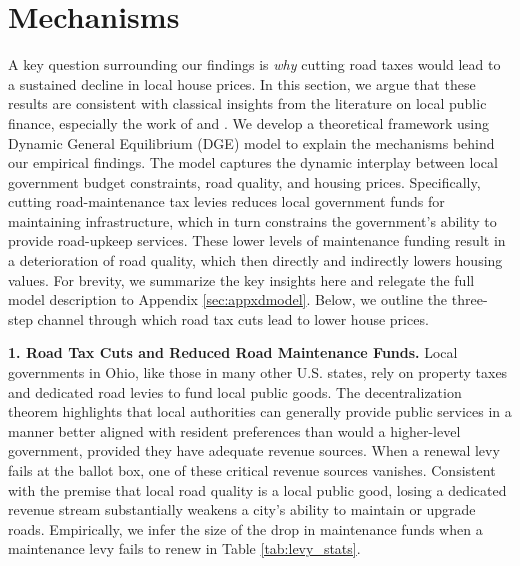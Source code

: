 \section{Mechanisms} \label{sec:mech}

A key question surrounding our findings is \textit{why} cutting road taxes would lead to a sustained decline in local house prices. In this section, we argue that these results are consistent with classical insights from the literature on local public finance, especially the work of \cite{Oates1972} and \cite{edel1974taxes}. We develop a theoretical framework using Dynamic General Equilibrium (DGE) model to explain the mechanisms behind our empirical findings.
The model captures the dynamic interplay between local government budget constraints, road quality, and housing prices. Specifically, cutting road-maintenance tax levies reduces local government funds for maintaining infrastructure, which in turn constrains the government’s ability to provide road-upkeep services. These lower levels of maintenance funding result in a deterioration of road quality, which then directly and indirectly lowers housing values. 
For brevity, we summarize the key insights here and relegate the full model description to Appendix \ref{sec:appxdmodel}. Below, we outline the three-step channel through which road tax cuts lead to lower house prices.


\noindent
{\bf 1. Road Tax Cuts and Reduced Road Maintenance Funds.} Local governments in Ohio, like those in many other U.S. states, rely on property taxes and dedicated road levies to fund local public goods. The \cite{Oates1972} decentralization theorem highlights that local authorities can generally provide public services in a manner better aligned with resident preferences than would a higher-level government, provided they have adequate revenue sources. When a renewal levy fails at the ballot box, one of these critical revenue sources vanishes. Consistent with the premise that local road quality is a local public good, losing a dedicated revenue stream substantially weakens a city’s ability to maintain or upgrade roads. Empirically, we infer the size of the drop in maintenance funds when a maintenance levy fails to renew in Table \ref{tab:levy_stats}.

